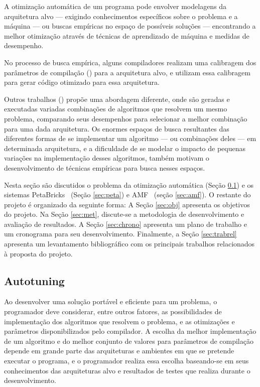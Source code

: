 \documentclass[a4paper, 11pt]{article}
\begin{document}
A otimização automática de um programa pode envolver modelagens da
arquitetura alvo --- exigindo conhecimentos específicos sobre o problema e a
máquina --- ou buscas empíricas no espaço de possíveis soluções --- encontrando
a melhor otimização através de técnicas de aprendizado de máquina e medidas de
desempenho.

No processo de busca empírica, alguns compiladores realizam uma calibragem dos 
parâmetros de compilação (\citet{bilmes1997,whaley1998}) para a arquitetura 
alvo, e utilizam essa calibragem para gerar código otimizado para essa 
arquitetura. 

Outros trabalhos (\citet{goldman2012framework,mitcsail-tr:2014,
vuduc2004}) propõe uma abordagem diferente, onde são geradas e executadas 
variadas combinações de algoritmos que resolvem um mesmo problema, comparando 
seus desempenhos para selecionar a melhor combinação para uma dada arquitetura.
Os enormes espaços de busca resultantes das diferentes formas de se implementar
um algoritmo --- ou combinações deles --- em determinada arquitetura, e a 
dificuldade de se modelar o impacto de pequenas variações na implementação 
desses algoritmos, também motivam o desenvolvimento de técnicas empíricas para
busca nesses espaços.

Nesta seção são discutidos o problema da otimização automática
(Seção \ref{sec:autotuning}) e os sistemas PetaBricks~\cite{ansel2014phd}
(Seção \ref{sec:peta}) e AMF~\cite{goldman2012framework} (seção \ref{sec:amf}).
O restante do projeto é organizado da seguinte forma: A Seção \ref{sec:obj} 
apresenta os objetivos do projeto. Na Seção \ref{sec:met}, discute-se a 
metodologia de desenvolvimento e avaliação de resultados. A Seção 
\ref{sec:chrono} apresenta um plano de trabalho e um cronograma para seu 
desenvolvimento. Finalmente, a Seção \ref{sec:trabrel} apresenta um 
levantamento bibliográfico com os principais trabalhos relacionados à proposta
do projeto.

\subsection{Autotuning} \label{sec:autotuning}

Ao desenvolver uma solução portável e eficiente para um problema, o
programador deve considerar, entre outros fatores, as possibilidades
de implementação dos algoritmos que resolvem o problema, e as otimizações e 
parâmetros disponibilizados pelo compilador.
A escolha da melhor implementação de um algoritmo e do melhor conjunto de 
valores para parâmetros de compilação depende em grande parte das arquiteturas 
e ambientes em que se pretende executar o programa, e o programador realiza 
essa escolha baseando-se em seus conhecimentos das arquiteturas alvo e 
resultados de testes que realiza durante o desenvolvimento.
\end{document}
